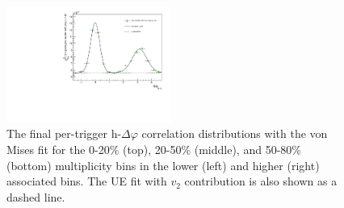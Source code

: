 \begin{figure}[ht]
    \includegraphics[width=0.48\textwidth]{figures/analysis/h_lambda_dphi_von_50_80_highpt.pdf}
    \caption{The final per-trigger h-\lmb $\Delta\varphi$ correlation distributions with the von Mises fit for the 0-20\% (top), 20-50\% (middle), and 50-80\% (bottom) multiplicity bins in the lower (left) and higher (right) associated \pt bins. The UE fit with $v_{2}$ contribution is also shown as a dashed line.}
    \label{fig:von_fits_lambda}
\end{figure}

